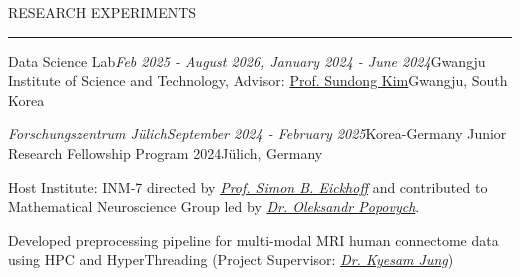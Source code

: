 \documentclass{resume} %
\renewenvironment{rSection}[1]{
\vspace{-0.5 em} %
\sectionskip
\textcolor{RoyalPurple}{\MakeUppercase{#1}}
\sectionlineskip
\hrule
\begin{list}{}{
\setlength{\leftmargin}{1.5em}
}
\item[]
}{
\end{list}
}
\begin{document}
\begin{rSection}{Research Experiments}
\begin{rSubsection}{Data Science Lab}{\em Feb 2025 - August 2026, January 2024 - June 2024}{Gwangju Institute of Science and Technology, Advisor: \href{https://sundong.kim/}{Prof. Sundong Kim}}{Gwangju, South Korea}
\end{rSubsection}


\vspace{-0.75 em}

\begin{rSubsection}{\em Forschungszentrum Jülich}{\em September 2024 - February 2025}{Korea-Germany Junior Research Fellowship Program 2024}{Jülich, Germany}
\vspace{-0.3 em}
\item Host Institute: INM-7 directed by \href{https://scholar.google.com/citations?user=wjpISMAAAAAJ&hl=de}{\emph{Prof. Simon B. Eickhoff}} and contributed to Mathematical Neuroscience Group led by \href{https://www.researchgate.net/scientific-contributions/Oleksandr-V-Popovych-39245813}{\emph{Dr. Oleksandr Popovych}}.
\item Developed preprocessing pipeline for multi-modal MRI human connectome data using HPC and HyperThreading (Project Supervisor: \href{https://www.researchgate.net/profile/Kyesam-Jung}{\emph{Dr. Kyesam Jung}})
\end{rSubsection}


\end{rSection}
\end{document}
